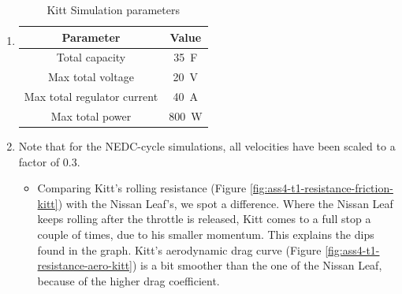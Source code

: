 \documentclass[11pt,titlepage]{report}
\begin{document}
\begin{enumerate}
\item
	\begin{table}[H]
		\centering
		\caption{Kitt Simulation parameters}
		\label{tab:ass4-sim-param-cap}
		\begin{tabular}{c c}
			\hline\hline
			Parameter & Value \\
			\hline
			Total capacity & \SI{35}{F} \cite{maxwell-dcell-datasheet} \\
			Max total voltage & \SI{20}{V} \\
			Max total regulator current & \SI{40}{A} \\
			Max total power & \SI{800}{W} \\
			\hline
			\end{tabular}
	\end{table}
\item
	Note that for the NEDC-cycle simulations, all velocities have been scaled to a factor of \num{0.3}.
	\begin{itemize}
		\item
		Comparing Kitt's rolling resistance (Figure \ref{fig:ass4-t1-resistance-friction-kitt}) with the Nissan Leaf's, we spot a difference. Where the Nissan Leaf keeps rolling after the throttle is released, Kitt comes to a full stop a couple of times, due to his smaller momentum. This explains the dips found in the graph. Kitt's aerodynamic drag curve (Figure \ref{fig:ass4-t1-resistance-aero-kitt}) is a bit smoother than the one of the Nissan Leaf, because of the higher drag coefficient.


\end{itemize}
\end{enumerate}
\end{document}
